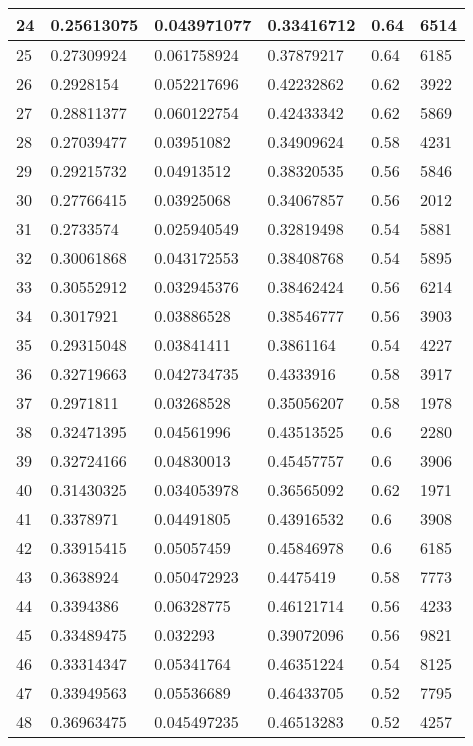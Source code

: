 \begin{longtable}{|l|l|l|l|l|l|}
24 & 0.25613075 & 0.043971077 & 0.33416712 & 0.64 & 6514 \\ \hline 
25 & 0.27309924 & 0.061758924 & 0.37879217 & 0.64 & 6185 \\ \hline 
26 & 0.2928154 & 0.052217696 & 0.42232862 & 0.62 & 3922 \\ \hline 
27 & 0.28811377 & 0.060122754 & 0.42433342 & 0.62 & 5869 \\ \hline 
28 & 0.27039477 & 0.03951082 & 0.34909624 & 0.58 & 4231 \\ \hline 
29 & 0.29215732 & 0.04913512 & 0.38320535 & 0.56 & 5846 \\ \hline 
30 & 0.27766415 & 0.03925068 & 0.34067857 & 0.56 & 2012 \\ \hline 
31 & 0.2733574 & 0.025940549 & 0.32819498 & 0.54 & 5881 \\ \hline 
32 & 0.30061868 & 0.043172553 & 0.38408768 & 0.54 & 5895 \\ \hline 
33 & 0.30552912 & 0.032945376 & 0.38462424 & 0.56 & 6214 \\ \hline 
34 & 0.3017921 & 0.03886528 & 0.38546777 & 0.56 & 3903 \\ \hline 
35 & 0.29315048 & 0.03841411 & 0.3861164 & 0.54 & 4227 \\ \hline 
36 & 0.32719663 & 0.042734735 & 0.4333916 & 0.58 & 3917 \\ \hline 
37 & 0.2971811 & 0.03268528 & 0.35056207 & 0.58 & 1978 \\ \hline 
38 & 0.32471395 & 0.04561996 & 0.43513525 & 0.6 & 2280 \\ \hline 
39 & 0.32724166 & 0.04830013 & 0.45457757 & 0.6 & 3906 \\ \hline 
40 & 0.31430325 & 0.034053978 & 0.36565092 & 0.62 & 1971 \\ \hline 
41 & 0.3378971 & 0.04491805 & 0.43916532 & 0.6 & 3908 \\ \hline 
42 & 0.33915415 & 0.05057459 & 0.45846978 & 0.6 & 6185 \\ \hline 
43 & 0.3638924 & 0.050472923 & 0.4475419 & 0.58 & 7773 \\ \hline 
44 & 0.3394386 & 0.06328775 & 0.46121714 & 0.56 & 4233 \\ \hline 
45 & 0.33489475 & 0.032293 & 0.39072096 & 0.56 & 9821 \\ \hline 
46 & 0.33314347 & 0.05341764 & 0.46351224 & 0.54 & 8125 \\ \hline 
47 & 0.33949563 & 0.05536689 & 0.46433705 & 0.52 & 7795 \\ \hline 
48 & 0.36963475 & 0.045497235 & 0.46513283 & 0.52 & 4257 \\ \hline 

\end{longtable}
